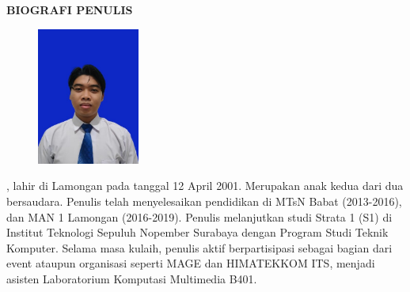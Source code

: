 \begin{center}
  \Large
  \textbf{BIOGRAFI PENULIS}
\end{center}


\vspace{2ex}

\begin{figure}
  \centering
  \vspace{-3ex}
  \includegraphics[width=0.3\textwidth]{../Gambar/Pasfoto.jpg}
  \vspace{-4ex}
\end{figure}

\name{}, lahir di Lamongan pada tanggal 12 April 2001. Merupakan anak kedua dari dua bersaudara. Penulis telah menyelesaikan pendidikan di MTsN Babat (2013-2016), dan MAN 1 Lamongan (2016-2019). Penulis melanjutkan studi Strata 1 (S1) di Institut Teknologi Sepuluh Nopember Surabaya dengan Program Studi Teknik Komputer. Selama masa kulaih, penulis aktif berpartisipasi sebagai bagian dari event ataupun organisasi seperti MAGE dan HIMATEKKOM ITS, menjadi asisten Laboratorium Komputasi Multimedia B401.
